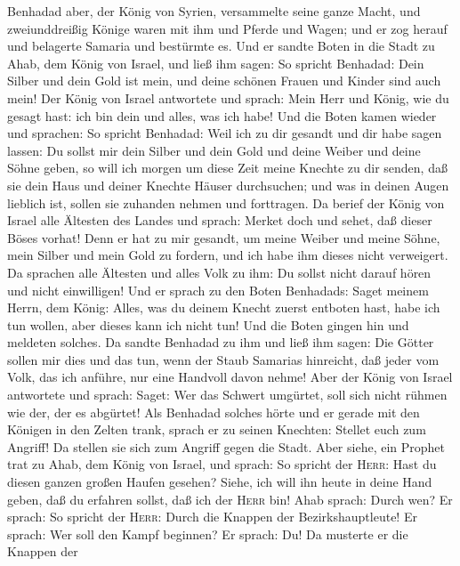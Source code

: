  Benhadad aber, der König von Syrien, versammelte seine
ganze Macht, und zweiunddreißig Könige waren mit ihm und Pferde und
Wagen; und er zog herauf und belagerte Samaria und bestürmte es.
 Und er sandte Boten in die Stadt zu Ahab, dem König von
Israel, und ließ ihm sagen:  So spricht Benhadad: Dein
Silber und dein Gold ist mein, und deine schönen Frauen und Kinder sind
auch mein!  Der König von Israel antwortete und sprach:
Mein Herr und König, wie du gesagt hast: ich bin dein und alles, was ich
habe!  Und die Boten kamen wieder und sprachen: So spricht
Benhadad: Weil ich zu dir gesandt und dir habe sagen lassen: Du sollst
mir dein Silber und dein Gold und deine Weiber und deine Söhne geben,
 so will ich morgen um diese Zeit meine Knechte zu dir
senden, daß sie dein Haus und deiner Knechte Häuser durchsuchen; und was
in deinen Augen lieblich ist, sollen sie zuhanden nehmen und forttragen.
 Da berief der König von Israel alle Ältesten des Landes
und sprach: Merket doch und sehet, daß dieser Böses vorhat! Denn er hat
zu mir gesandt, um meine Weiber und meine Söhne, mein Silber und mein
Gold zu fordern, und ich habe ihm dieses nicht verweigert.
 Da sprachen alle Ältesten und alles Volk zu ihm: Du
sollst nicht darauf hören und nicht einwilligen!  Und er
sprach zu den Boten Benhadads: Saget meinem Herrn, dem König: Alles, was
du deinem Knecht zuerst entboten hast, habe ich tun wollen, aber dieses
kann ich nicht tun! Und die Boten gingen hin und meldeten solches.
 Da sandte Benhadad zu ihm und ließ ihm sagen: Die Götter
sollen mir dies und das tun, wenn der Staub Samarias hinreicht, daß
jeder vom Volk, das ich anführe, nur eine Handvoll davon nehme!
 Aber der König von Israel antwortete und sprach: Saget:
Wer das Schwert umgürtet, soll sich nicht rühmen wie der, der es
abgürtet!  Als Benhadad solches hörte und er gerade mit
den Königen in den Zelten trank, sprach er zu seinen Knechten: Stellet
euch zum Angriff! Da stellen sie sich zum Angriff gegen die Stadt.
 Aber siehe, ein Prophet trat zu Ahab, dem König von
Israel, und sprach: So spricht der \textsc{Herr}: Hast du diesen ganzen
großen Haufen gesehen? Siehe, ich will ihn heute in deine Hand geben,
daß du erfahren sollst, daß ich der \textsc{Herr} bin! 
Ahab sprach: Durch wen? Er sprach: So spricht der \textsc{Herr}: Durch
die Knappen der Bezirkshauptleute! Er sprach: Wer soll den Kampf
beginnen? Er sprach: Du!  Da musterte er die Knappen der
